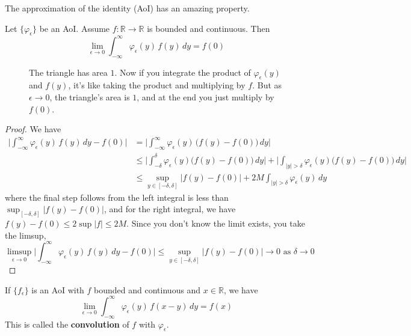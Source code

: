   The approximation of the identity (AoI) has an amazing property. 

  \begin{theorem}
    Let $\{\varphi_\epsilon\}$ be an AoI. Assume $f: \mathbb{R} \to \mathbb{R}$ is bounded and continuous. Then 
    \begin{equation}
      \lim_{\epsilon \to 0} \int_{-\infty}^\infty \varphi_\epsilon (y) \, f(y) \,dy = f(0)
    \end{equation}

    \begin{figure}[H]
      \centering 
      \caption{The triangle has area $1$. Now if you integrate the product of $\varphi_\epsilon (y)$ and $f(y)$, it's like taking the product and multiplying by $f$. But as $\epsilon \to 0$, the triangle's area is $1$, and at the end you just multiply by $f(0)$. } 
      \label{fig:aoi}
    \end{figure}
  \end{theorem}
  \begin{proof}
    We have 
    \begin{align}
      \bigg| \int_{-\infty}^\infty \varphi_\epsilon (y) \, f(y) \,dy - f(0) \bigg| & = \bigg| \int_{-\infty}^\infty \varphi_\epsilon (y) \, \big( f(y) - f(0) \big) \,dy \bigg| \\ 
                                                                                   & \leq \bigg| \int_{-\delta}^{\delta} \varphi_\epsilon (y) \big( f(y) - f(0) \big) \,dy \bigg| + \bigg| \int_{|y| > \delta} \varphi_\epsilon (y) \big( f(y) - f(0) \big) \,dy \bigg| \\ 
                                                                                   & \leq \sup_{y \in [-\delta, \delta]} |f(y) - f(0)| + 2 M \int_{|y| > \delta} \varphi_\epsilon (y) \,dy 
    \end{align}
    where the final step follows from the left integral is less than $\sup_{[-\delta, \delta]} |f(y) - f(0)|$, and for the right integral, we have $f(y) - f(0) \leq 2 \sup |f| \leq 2 M$. Since you don't know the limit exists, you take the limsup, 
    \begin{equation}
      \limsup_{\epsilon \to 0} \bigg| \int_{-\infty}^\infty \varphi_\epsilon (y) \, f(y) \,dy - f(0) \bigg| \leq \sup_{y \in [-\delta, \delta]} |f(y) - f(0)| \to 0 \text{ as } \delta \to 0
    \end{equation}
  \end{proof}

  \begin{corollary}[Convolution]
    If $\{f_\epsilon\}$ is an AoI with $f$ bounded and continuous and $x \in \mathbb{R}$, we have 
    \begin{equation}
      \lim_{\epsilon \to 0} \int_{-\infty}^\infty \varphi_\epsilon (y) \, f(x - y) \,dy  = f(x)
    \end{equation}
    This is called the \textbf{convolution} of $f$ with $\varphi_\epsilon$. 
  \end{corollary}

